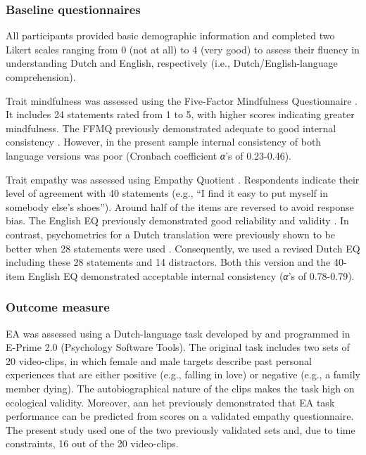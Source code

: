 \documentclass[authordate, empirical, issue]{jote-new-article}
\begin{document}
\subsubsection{Baseline questionnaires}



All participants provided basic demographic information and completed two Likert scales ranging from 0 (not at all) to 4 (very good) to assess their fluency in understanding Dutch and English, respectively (i.e., Dutch/English-language comprehension).



Trait mindfulness was assessed using the Five-Factor Mindfulness Questionnaire \parencites[FFMQ;][]{Bohlmeijer2011}. It includes 24 statements rated from 1 to 5, with higher scores indicating greater mindfulness. The FFMQ previously demonstrated adequate to good internal consistency \parencites{Bohlmeijer2011}. However, in the present sample internal consistency of both language versions was poor (Cronbach coefficient \emph{α}'s of 0.23-0.46).



Trait empathy was assessed using Empathy Quotient \parencites[EQ;][]{Groen2015}{Lawrence2004}. Respondents indicate their level of agreement with 40 statements (e.g., “I find it easy to put myself in somebody else's shoes”). Around half of the items are reversed to avoid response bias. The English EQ previously demonstrated good reliability and validity \parencites{Lawrence2004}. In contrast, psychometrics for a Dutch translation were previously shown to be better when 28 statements were used \parencites{Groen2015}. Consequently, we used a revised Dutch EQ including these 28 statements and 14 distractors. Both this version and the 40-item English EQ demonstrated acceptable internal consistency (\emph{α}'s of 0.78-0.79).



\subsubsection{Outcome measure}



EA was assessed using a Dutch-language task developed by \textcites{aanhetRot2014} and programmed in E-Prime 2.0 (Psychology Software Tools). The original task includes two sets of 20 video-clips, in which female and male targets describe past personal experiences that are either positive (e.g., falling in love) or negative (e.g., a family member dying). The autobiographical nature of the clips makes the task high on ecological validity. Moreover, aan het \textcites{aanhetRot2014} previously demonstrated that EA task performance can be predicted from scores on a validated empathy questionnaire. The present study used one of the two previously validated sets and, due to time constraints, 16 out of the 20 video-clips.
\end{document}
